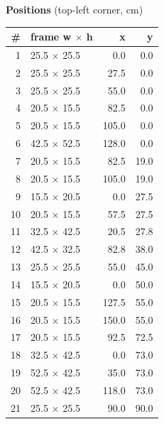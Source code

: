 \documentclass[a4paper,landscape,10pt]{article}
\begin{document}
\begin{minipage}[t]{0.25\textwidth}
\vspace{8pt}
{\bfseries Positions} (top-left corner, cm)\\[2pt]
\tiny
\begin{tabular}{@{}r l r r@{}}
\toprule
\# & frame w $\times$ h & x & y \\
\midrule
1 & 25.5 $\times$ 25.5 & 0.0 & 0.0 \\
2 & 25.5 $\times$ 25.5 & 27.5 & 0.0 \\
3 & 25.5 $\times$ 25.5 & 55.0 & 0.0 \\
4 & 20.5 $\times$ 15.5 & 82.5 & 0.0 \\
5 & 20.5 $\times$ 15.5 & 105.0 & 0.0 \\
6 & 42.5 $\times$ 52.5 & 128.0 & 0.0 \\
7 & 20.5 $\times$ 15.5 & 82.5 & 19.0 \\
8 & 20.5 $\times$ 15.5 & 105.0 & 19.0 \\
9 & 15.5 $\times$ 20.5 & 0.0 & 27.5 \\
10 & 20.5 $\times$ 15.5 & 57.5 & 27.5 \\
11 & 32.5 $\times$ 42.5 & 20.5 & 27.8 \\
12 & 42.5 $\times$ 32.5 & 82.8 & 38.0 \\
13 & 25.5 $\times$ 25.5 & 55.0 & 45.0 \\
14 & 15.5 $\times$ 20.5 & 0.0 & 50.0 \\
15 & 20.5 $\times$ 15.5 & 127.5 & 55.0 \\
16 & 20.5 $\times$ 15.5 & 150.0 & 55.0 \\
17 & 20.5 $\times$ 15.5 & 92.5 & 72.5 \\
18 & 32.5 $\times$ 42.5 & 0.0 & 73.0 \\
19 & 52.5 $\times$ 42.5 & 35.0 & 73.0 \\
20 & 52.5 $\times$ 42.5 & 118.0 & 73.0 \\
21 & 25.5 $\times$ 25.5 & 90.0 & 90.0 \\
\bottomrule
\end{tabular}
\end{minipage}
\clearpage
\end{document}
